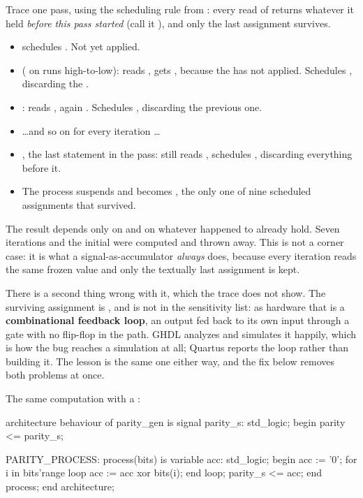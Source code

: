 \noindent Trace one pass, using the scheduling rule from : every read of
 returns whatever it held \emph{before this pass started} (call it
), and only the last assignment survives.
\begin{itemize}
  \item {} schedules . Not yet applied.
  \item {} ( on  runs high-to-low): reads
    , gets , because the  has not applied. Schedules
    , discarding the .
  \item {}: reads , again . Schedules
    , discarding the previous one.
  \item \ldots and so on for every iteration \ldots
  \item {}, the last statement in the pass: still reads , schedules
    , discarding everything before it.
  \item The process suspends and  becomes , the only one
    of nine scheduled assignments that survived.
\end{itemize}
The result depends only on  and on whatever  happened to already hold.
Seven iterations and the initial  were computed and thrown away. This is not a corner
case: it is what a signal-as-accumulator \emph{always} does, because every iteration reads the same
frozen value and only the textually last assignment is kept.

There is a second thing wrong with it, which the trace does not show. The surviving assignment is
, and  is not in the sensitivity list: as
hardware that is a \textbf{combinational feedback loop}, an output fed back to its own input through
a gate with no flip-flop in the path. GHDL analyzes and simulates it happily, which is how the bug
reaches a simulation at all; Quartus reports the loop rather than building it. The lesson is the
same one either way, and the fix below removes both problems at once.

The same computation with a :

\begin{vhdlcode}
architecture behaviour of parity_gen is
signal parity_s: std_logic;
begin
    parity <= parity_s;

    PARITY_PROCESS: process(bits) is
        variable acc: std_logic;
    begin
        acc := '0';
        for i in bits'range loop
            acc := acc xor bits(i);
        end loop;
        parity_s <= acc;
    end process;
end architecture;
\end{vhdlcode}

